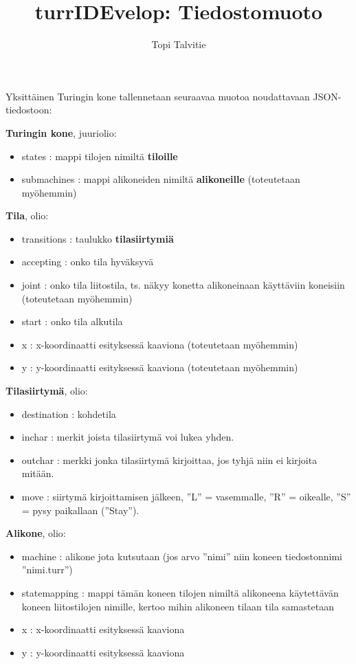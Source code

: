 \documentclass[a4paper, 11pt, finnish]{article}
\author{Topi Talvitie}
\title{turrIDEvelop: Tiedostomuoto}
\begin{document}
\maketitle

Yksittäinen Turingin kone tallennetaan seuraavaa muotoa noudattavaan
JSON-tiedostoon:

\textbf{Turingin kone}, juuriolio:
\begin{itemize}
\item states : mappi tilojen nimiltä \textbf{tiloille}
\item submachines : mappi alikoneiden nimiltä \textbf{alikoneille} (toteutetaan
myöhemmin)
\end{itemize}

\textbf{Tila}, olio:
\begin{itemize}
\item transitions : taulukko \textbf{tilasiirtymiä}
\item accepting : onko tila hyväksyvä
\item joint : onko tila liitostila, ts. näkyy konetta alikoneinaan käyttäviin
koneisiin (toteutetaan myöhemmin)
\item start : onko tila alkutila
\item x : x-koordinaatti esityksessä kaaviona (toteutetaan myöhemmin)
\item y : y-koordinaatti esityksessä kaaviona (toteutetaan myöhemmin)
\end{itemize}

\textbf{Tilasiirtymä}, olio:
\begin{itemize}
\item destination : kohdetila
\item inchar : merkit joista tilasiirtymä voi lukea yhden.
\item outchar : merkki jonka tilasiirtymä kirjoittaa, jos tyhjä niin ei
kirjoita mitään.
\item move : siirtymä kirjoittamisen jälkeen, ''L'' = vasemmalle, ''R'' =
oikealle, ''S'' = pysy paikallaan (''Stay'').
\end{itemize}

\textbf{Alikone}, olio:
\begin{itemize}
\item machine : alikone jota kutsutaan (jos arvo ''nimi'' niin koneen
tiedostonnimi ''nimi.turr'')
\item statemapping : mappi tämän koneen tilojen nimiltä alikoneena käytettävän
koneen liitostilojen nimille, kertoo mihin alikoneen tilaan tila samastetaan
\item x : x-koordinaatti esityksessä kaaviona
\item y : y-koordinaatti esityksessä kaaviona
\end{itemize}
\end{document}
